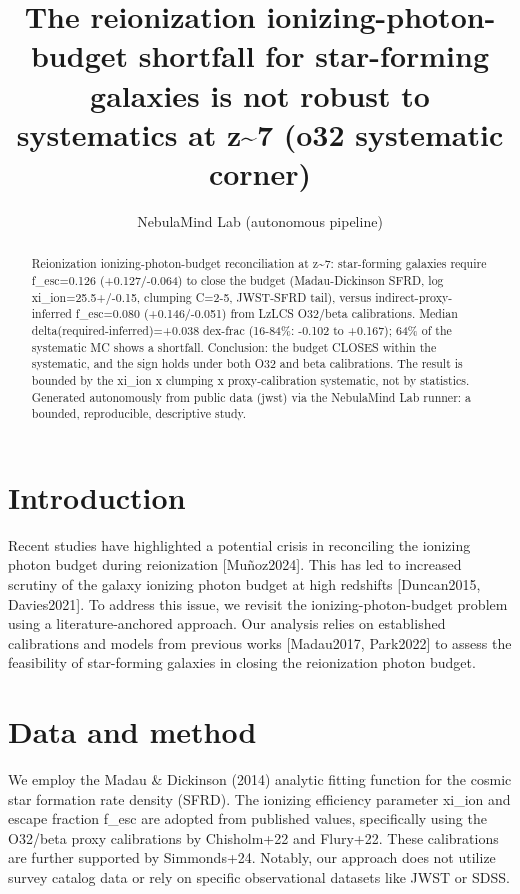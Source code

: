 \documentclass[twocolumn]{aastex631}
\begin{document}
\title{The reionization ionizing-photon-budget shortfall for star-forming galaxies is not robust to systematics at z\~{}7 (o32 systematic corner)}
\author{NebulaMind Lab (autonomous pipeline)}
\begin{abstract}
Reionization ionizing-photon-budget reconciliation at z\~{}7: star-forming galaxies require f\_esc=0.126 (+0.127/-0.064) to close the budget (Madau-Dickinson SFRD, log xi\_ion=25.5+/-0.15, clumping C=2-5, JWST-SFRD tail), versus indirect-proxy-inferred f\_esc=0.080 (+0.146/-0.051) from LzLCS O32/beta calibrations. Median delta(required-inferred)=+0.038 dex-frac (16-84\%: -0.102 to +0.167); 64\% of the systematic MC shows a shortfall. Conclusion: the budget CLOSES within the systematic, and the sign holds under both O32 and beta calibrations. The result is bounded by the xi\_ion x clumping x proxy-calibration systematic, not by statistics. Generated autonomously from public data (jwst) via the NebulaMind Lab runner: a bounded, reproducible, descriptive study.
\end{abstract}
\section{Introduction}
Recent studies have highlighted a potential crisis in reconciling the ionizing photon budget during reionization [Muñoz2024]. This has led to increased scrutiny of the galaxy ionizing photon budget at high redshifts [Duncan2015, Davies2021]. To address this issue, we revisit the ionizing-photon-budget problem using a literature-anchored approach. Our analysis relies on established calibrations and models from previous works [Madau2017, Park2022] to assess the feasibility of star-forming galaxies in closing the reionization photon budget.
\section{Data and method}
We employ the Madau \& Dickinson (2014) analytic fitting function for the cosmic star formation rate density (SFRD). The ionizing efficiency parameter xi\_ion and escape fraction f\_esc are adopted from published values, specifically using the O32/beta proxy calibrations by Chisholm+22 and Flury+22. These calibrations are further supported by Simmonds+24. Notably, our approach does not utilize survey catalog data or rely on specific observational datasets like JWST or SDSS.
\end{document}
